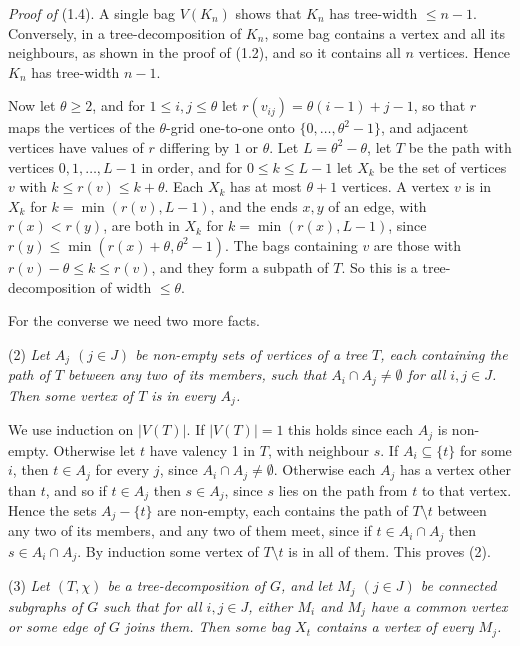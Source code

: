 {\textit{Proof of} (1.4). A single bag $V(K_n)$ shows that $K_n$ has tree-width $\le n - 1$.
Conversely, in a tree-decomposition of $K_n$, some bag contains a vertex and all its neighbours, as
shown in the proof of (1.2), and so it contains all $n$ vertices. Hence $K_n$ has tree-width
$n - 1$.

Now let $\theta \ge 2$, and for $1 \le i, j \le \theta$ let $r(v_{ij}) = \theta(i - 1) + j - 1$, so
that $r$ maps the vertices of the $\theta$-grid one-to-one onto $\{0, \dots, \theta^2 - 1\}$, and
adjacent vertices have values of $r$ differing by $1$ or $\theta$. Let $L = \theta^2 - \theta$, let
$T$ be the path with vertices $0, 1, \dots, L - 1$ in order, and for $0 \le k \le L - 1$ let
$X_k$ be the set of vertices $v$ with $k \le r(v) \le k + \theta$. Each $X_k$ has at most
$\theta + 1$ vertices. A vertex $v$ is in $X_k$ for $k = \min(r(v), L - 1)$, and the ends $x, y$ of
an edge, with $r(x) < r(y)$, are both in $X_k$ for $k = \min(r(x), L - 1)$, since
$r(y) \le \min(r(x) + \theta, \theta^2 - 1)$. The bags containing $v$ are those with
$r(v) - \theta \le k \le r(v)$, and they form a subpath of $T$. So this is a tree-decomposition of
width $\le \theta$.

For the converse we need two more facts.

\hspace*{12pt}(2) \textit{Let $A_j$ $(j \in J)$ be non-empty sets of vertices of a tree $T$, each
containing the path of $T$ between any two of its members, such that $A_i \cap A_j \ne \emptyset$
for all $i, j \in J$. Then some vertex of $T$ is in every $A_j$.}

We use induction on $|V(T)|$. If $|V(T)| = 1$ this holds since each $A_j$ is non-empty. Otherwise
let $t$ have valency 1 in $T$, with neighbour $s$. If $A_i \subseteq \{t\}$ for some $i$, then
$t \in A_j$ for every $j$, since $A_i \cap A_j \ne \emptyset$. Otherwise each $A_j$ has a vertex
other than $t$, and so if $t \in A_j$ then $s \in A_j$, since $s$ lies on the path from $t$ to that
vertex. Hence the sets $A_j - \{t\}$ are non-empty, each contains the path of $T \setminus t$
between any two of its members, and any two of them meet, since if $t \in A_i \cap A_j$ then
$s \in A_i \cap A_j$. By induction some vertex of
$T \setminus t$ is in all of them. This proves (2).

\hspace*{12pt}(3) \textit{Let $(T, \chi)$ be a tree-decomposition of $G$, and let $M_j$ $(j \in J)$ be
connected subgraphs of $G$ such that for all
$i, j \in J$, either $M_i$ and $M_j$ have a common vertex or some edge of $G$ joins them. Then some
bag $X_t$ contains a vertex of every $M_j$.}

}
